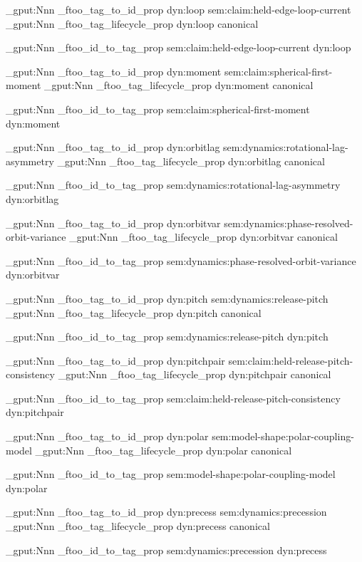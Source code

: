 \prop_gput:Nnn \g_ftoo_tag_to_id_prop { dyn:loop } { sem:claim:held-edge-loop-current }
\prop_gput:Nnn \g_ftoo_tag_lifecycle_prop { dyn:loop } { canonical }

\prop_gput:Nnn \g_ftoo_id_to_tag_prop { sem:claim:held-edge-loop-current } { dyn:loop }


\prop_gput:Nnn \g_ftoo_tag_to_id_prop { dyn:moment } { sem:claim:spherical-first-moment }
\prop_gput:Nnn \g_ftoo_tag_lifecycle_prop { dyn:moment } { canonical }

\prop_gput:Nnn \g_ftoo_id_to_tag_prop { sem:claim:spherical-first-moment } { dyn:moment }


\prop_gput:Nnn \g_ftoo_tag_to_id_prop { dyn:orbitlag } { sem:dynamics:rotational-lag-asymmetry }
\prop_gput:Nnn \g_ftoo_tag_lifecycle_prop { dyn:orbitlag } { canonical }

\prop_gput:Nnn \g_ftoo_id_to_tag_prop { sem:dynamics:rotational-lag-asymmetry } { dyn:orbitlag }


\prop_gput:Nnn \g_ftoo_tag_to_id_prop { dyn:orbitvar } { sem:dynamics:phase-resolved-orbit-variance }
\prop_gput:Nnn \g_ftoo_tag_lifecycle_prop { dyn:orbitvar } { canonical }

\prop_gput:Nnn \g_ftoo_id_to_tag_prop { sem:dynamics:phase-resolved-orbit-variance } { dyn:orbitvar }


\prop_gput:Nnn \g_ftoo_tag_to_id_prop { dyn:pitch } { sem:dynamics:release-pitch }
\prop_gput:Nnn \g_ftoo_tag_lifecycle_prop { dyn:pitch } { canonical }

\prop_gput:Nnn \g_ftoo_id_to_tag_prop { sem:dynamics:release-pitch } { dyn:pitch }


\prop_gput:Nnn \g_ftoo_tag_to_id_prop { dyn:pitchpair } { sem:claim:held-release-pitch-consistency }
\prop_gput:Nnn \g_ftoo_tag_lifecycle_prop { dyn:pitchpair } { canonical }

\prop_gput:Nnn \g_ftoo_id_to_tag_prop { sem:claim:held-release-pitch-consistency } { dyn:pitchpair }


\prop_gput:Nnn \g_ftoo_tag_to_id_prop { dyn:polar } { sem:model-shape:polar-coupling-model }
\prop_gput:Nnn \g_ftoo_tag_lifecycle_prop { dyn:polar } { canonical }

\prop_gput:Nnn \g_ftoo_id_to_tag_prop { sem:model-shape:polar-coupling-model } { dyn:polar }


\prop_gput:Nnn \g_ftoo_tag_to_id_prop { dyn:precess } { sem:dynamics:precession }
\prop_gput:Nnn \g_ftoo_tag_lifecycle_prop { dyn:precess } { canonical }

\prop_gput:Nnn \g_ftoo_id_to_tag_prop { sem:dynamics:precession } { dyn:precess }


